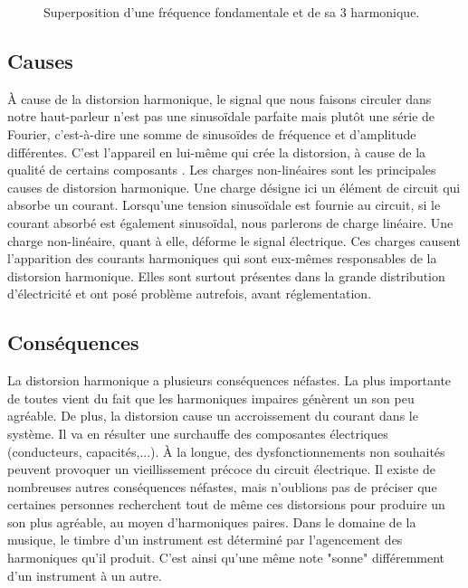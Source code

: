 \begin{figure}[ht!]
	\centering
	\caption{Superposition d'une fréquence fondamentale et de sa 3 harmonique.}
	\label{harmonic} 
\end{figure}

\subsection{Causes}
À cause de la distorsion harmonique, le signal que nous faisons circuler dans notre haut-parleur n'est pas
une sinusoïdale parfaite mais plutôt une série de Fourier, c'est-à-dire une somme de sinusoïdes de 
fréquence et d'amplitude différentes. C'est l'appareil en lui-même qui crée la distorsion, à cause de la qualité
de certains composants\cite{cuccia} \cite{termans}.
Les charges non-linéaires sont les principales causes de distorsion harmonique. 
Une charge désigne ici un élément de circuit qui absorbe un courant. Lorsqu'une tension sinusoïdale est
fournie au circuit, si le courant absorbé est également sinusoïdal, nous parlerons de charge linéaire.
Une charge non-linéaire, quant à elle, déforme le signal électrique. Ces charges causent 
l'apparition des courants harmoniques qui sont eux-mêmes responsables de la distorsion harmonique. Elles sont 
surtout présentes dans la grande distribution d'électricité et ont posé problème autrefois, avant réglementation\cite{chargeslin}.

\subsection{Conséquences}
La distorsion harmonique a plusieurs conséquences néfastes.
La plus importante de toutes vient du fait que les harmoniques impaires génèrent un son peu agréable. De plus, la distorsion cause un accroissement 
du courant dans le système. Il va en résulter une surchauffe des composantes électriques (conducteurs, 
capacités,...). À la longue, des dysfonctionnements non souhaités peuvent provoquer un vieillissement 
précoce du circuit électrique\cite{brevet2}. Il existe de nombreuses autres conséquences néfastes, 
mais n'oublions pas de préciser que certaines personnes recherchent tout de même ces distorsions pour 
produire un son plus agréable, au moyen d'harmoniques paires. Dans le domaine de la musique, le timbre 
d'un instrument est déterminé par l'agencement des harmoniques qu'il produit. C'est ainsi qu'une même note
"sonne" différemment d'un instrument à un autre.

